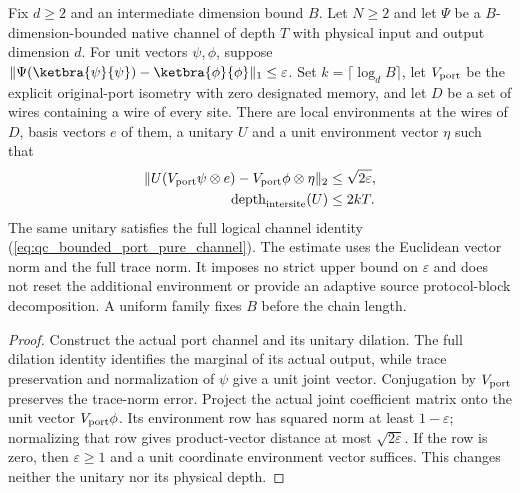 \begin{lemma}
    \label{lem:qc_bounded_port_approximate_output}
    \leanok
    Fix $d\ge2$ and an intermediate dimension bound $B$. Let $N\ge2$ and
    let $\Psi$ be a $B$-dimension-bounded native channel of depth $T$ with
    physical input and output dimension $d$. For unit vectors $\psi,\phi$,
    suppose
    $\|\Psi(\ketbra{\psi}{\psi})-\ketbra{\phi}{\phi}\|_1\le\varepsilon$.
    Set $k=\lceil\log_d B\rceil$, let $V_{\rm port}$ be the explicit
    original-port isometry with zero designated memory, and let $D$ be a set of wires
    containing a wire of every site. There are local environments at the wires of $D$, basis
    vectors $e$ of them, a unitary $U$ and a unit environment vector $\eta$ such that
    \begin{align}
        \|U(V_{\rm port}\psi\otimes e)
        -V_{\rm port}\phi\otimes\eta\|_2        & \le\sqrt{2\varepsilon},
        \label{eq:qc_bounded_port_approximate_vector}                     \\
        \operatorname{depth}_{\rm intersite}(U) & \le2kT.
    \end{align}
    The same unitary satisfies the full logical channel identity
    (\ref{eq:qc_bounded_port_pure_channel}). The estimate uses the Euclidean
    vector norm and the full trace norm. It imposes no strict upper bound on
    $\varepsilon$ and does not reset the additional environment or provide
    an adaptive source protocol-block decomposition. A uniform family fixes
    $B$ before the chain length.
\end{lemma}
\begin{proof}
    \leanok
    Construct the actual port channel and its unitary dilation. The full
    dilation identity identifies the marginal of its actual output, while
    trace preservation and normalization of $\psi$ give a unit joint vector.
    Conjugation by $V_{\rm port}$ preserves the trace-norm error. Project
    the actual joint coefficient matrix onto the unit vector
    $V_{\rm port}\phi$. Its environment row has squared norm at least
    $1-\varepsilon$; normalizing that row gives product-vector distance at
    most $\sqrt{2\varepsilon}$. If the row is zero, then
    $\varepsilon\ge1$ and a unit coordinate environment vector suffices.
    This changes neither the unitary nor its physical depth.
\end{proof}
